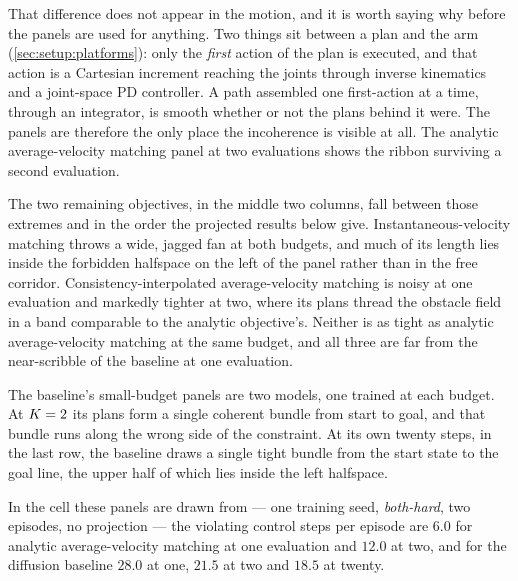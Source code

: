 That difference does not appear in the motion, and it is worth saying why before the panels are used for
anything. Two things sit between a plan and the arm (\autoref{sec:setup:platforms}): only the
\emph{first} action of the plan is executed, and that action is a Cartesian increment reaching the joints
through inverse kinematics and a joint-space PD controller. A path assembled one first-action at a time,
through an integrator, is smooth whether or not the plans behind it were. The panels are therefore the
only place the incoherence is visible at all. The analytic average-velocity matching panel at two
evaluations shows the ribbon surviving a second evaluation.

The two remaining objectives, in the middle two columns, fall between those extremes and in the order
the projected results below give. Instantaneous-velocity matching throws a wide, jagged fan at both budgets, and much of its length
lies inside the forbidden halfspace on the left of the panel rather than in the free corridor.
Consistency-interpolated average-velocity matching is noisy at one evaluation and markedly tighter at two,
where its plans thread the obstacle field in a band comparable to the analytic objective's. Neither is as
tight as analytic average-velocity matching at the same budget, and all three are far from the near-scribble
of the baseline at one evaluation.

The baseline's small-budget panels are two models, one trained at each budget. At $K=2$ its plans
form a single coherent bundle from start to goal, and that bundle runs along the wrong side of the
constraint. At its own twenty steps, in the last row, the baseline draws a single tight bundle from the
start state to the goal line, the upper half of which lies inside the left halfspace.

In the cell these panels are drawn from --- one training seed, \emph{both-hard}, two episodes, no
projection --- the violating control steps per episode are $6.0$ for analytic average-velocity matching at one evaluation and $12.0$ at two, and for the
diffusion baseline $28.0$ at one, $21.5$ at two and $18.5$ at twenty.

